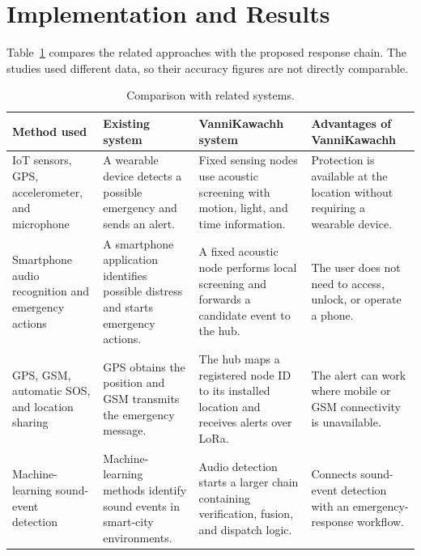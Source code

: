 \documentclass[conference]{IEEEtran}
\renewcommand{\arraystretch}{1.10}
\begin{document}
\section{Implementation and Results}
\label{sec:results}
Table~\ref{tab:comparison} compares the related approaches with the proposed response chain. The studies used different data, so their accuracy figures are not directly comparable.
\begin{table}[!t]
\caption{Comparison with related systems.}
\label{tab:comparison}
\centering
\footnotesize
\setlength{\tabcolsep}{4pt}
\renewcommand{\arraystretch}{1.15}

\begin{tabularx}{\textwidth}{|
>{\raggedright\arraybackslash}p{3.15cm}|
>{\raggedright\arraybackslash}X|
>{\raggedright\arraybackslash}X|
>{\raggedright\arraybackslash}X|}
\hline
\textbf{Method used} &
\textbf{Existing system} &
\textbf{VanniKawachh system} &
\textbf{Advantages of VanniKawachh} \\
\hline

IoT sensors, GPS, accelerometer, and microphone~\cite{bharathi2025} &
A wearable device detects a possible emergency and sends an alert. &
Fixed sensing nodes use acoustic screening with motion, light, and time information. &
Protection is available at the location without requiring a wearable device. \\
\hline

Smartphone audio recognition and emergency actions~\cite{pavithra2026} &
A smartphone application identifies possible distress and starts emergency actions. &
A fixed acoustic node performs local screening and forwards a candidate event to the hub. &
The user does not need to access, unlock, or operate a phone. \\
\hline

GPS, GSM, automatic SOS, and location sharing~\cite{potturi2026} &
GPS obtains the position and GSM transmits the emergency message. &
The hub maps a registered node ID to its installed location and receives alerts over LoRa. &
The alert can work where mobile or GSM connectivity is unavailable. \\
\hline

Machine-learning sound-event detection~\cite{ciaburro2026} &
Machine-learning methods identify sound events in smart-city environments. &
Audio detection starts a larger chain containing verification, fusion, and dispatch logic. &
Connects sound-event detection with an emergency-response workflow. \\
\hline


\end{tabularx}
\end{table}
\end{document}
